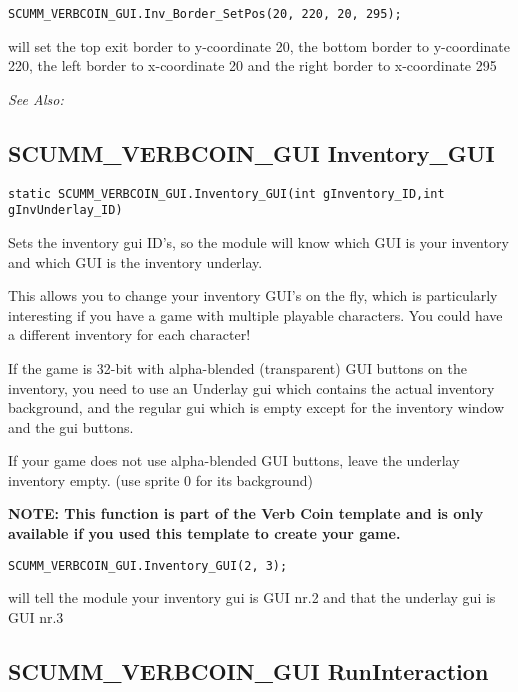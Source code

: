 \begin{verbatim}
SCUMM_VERBCOIN_GUI.Inv_Border_SetPos(20, 220, 20, 295);
\end{verbatim}

will set the top exit border to y-coordinate 20, the bottom border to y-coordinate 220,
the left border to x-coordinate 20 and the right border to x-coordinate 295

\it{See Also:} 


\subsection{SCUMM_VERBCOIN_GUI Inventory_GUI}\label{SCUMM_VERBCOIN_GUI.Inventory_GUI}%

\begin{verbatim}
static SCUMM_VERBCOIN_GUI.Inventory_GUI(int gInventory_ID,int gInvUnderlay_ID)
\end{verbatim}
Sets the inventory gui ID's, so the module will know which GUI is your
inventory and which GUI is the inventory underlay.

This allows you to change your inventory GUI's on the fly, which is particularly
interesting if you have a game with multiple playable characters. You could have
a different inventory for each character!

If the game is 32-bit with alpha-blended (transparent) GUI buttons on the
inventory, you need to use an Underlay gui which contains the actual inventory
background, and the regular gui which is empty except for the inventory window
and the gui buttons.

If your game does not use alpha-blended GUI buttons, leave the underlay inventory
empty. (use sprite 0 for its background)

\bf{NOTE:} This function is part of the Verb Coin template and is only available if
you used this template to create your game.

\begin{verbatim}
SCUMM_VERBCOIN_GUI.Inventory_GUI(2, 3);
\end{verbatim}

will tell the module your inventory gui is GUI nr.2 and that the underlay gui is GUI nr.3


\subsection{SCUMM_VERBCOIN_GUI RunInteraction}\label{SCUMM_VERBCOIN_GUI.RunInteraction}%

